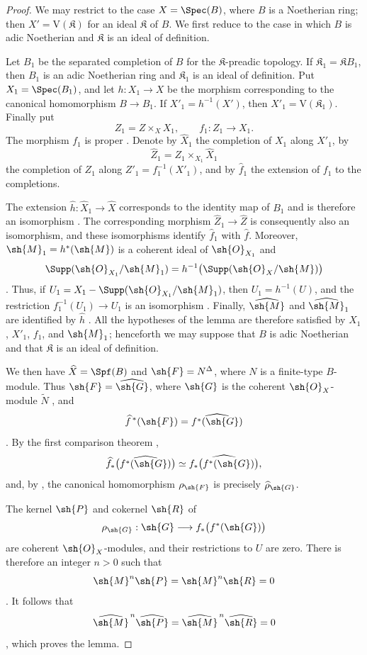 \begin{proof}
We may restrict to the case $X=\Spec(B)$, where $B$ is a
Noetherian ring; then $X'=\mathrm{V}(\mathfrak{K})$ for an ideal
$\mathfrak{K}$ of $B$.  We first reduce to the case in which $B$ is
adic Noetherian and $\mathfrak{K}$ is an ideal of definition.

Let $B_1$ be the separated completion of $B$ for the
$\mathfrak{K}$-preadic topology.
If $\mathfrak{K}_1=\mathfrak{K}B_1$, then $B_1$ is an adic
Noetherian ring and $\mathfrak{K}_1$ is an ideal of definition.
Put $X_1=\Spec(B_1)$, and let $h:X_1\to X$ be the morphism
corresponding to the canonical homomorphism $B\to B_1$.  If
$X'_1=h^{-1}(X')$, then $X'_1=\mathrm{V}(\mathfrak{K}_1)$.  Finally
put
\[
  Z_1=Z\times_X X_1,\qquad f_1:Z_1\longrightarrow X_1.
\]
The morphism $f_1$ is proper .  Denote by
$\widehat{X}_1$ the completion of $X_1$ along $X'_1$, by
\[
  \widehat{Z}_1=
  Z_1\times_{X_1}\widehat{X}_1
\]
the completion of $Z_1$ along
$Z'_1=f_1^{-1}(X'_1)$, and by
$\widehat{f}_1$ the extension of $f_1$ to the completions.

The extension
$\widehat{h}:\widehat{X}_1\to\widehat{X}$ corresponds to the
identity map of $B_1$ and is therefore an isomorphism
.  The corresponding morphism
$\widehat{Z}_1\to\widehat{Z}$ is consequently also an isomorphism,
and these isomorphisms identify $\widehat{f}_1$ with
$\widehat{f}$.  Moreover,
$\sh{M}_1=h^*(\sh{M})$ is a coherent ideal of $\sh{O}_{X_1}$ and
\[
  \Supp(\sh{O}_{X_1}/\sh{M}_1)
  =h^{-1}\bigl(\Supp(\sh{O}_X/\sh{M})\bigr)
\]
.  Thus, if
$U_1=X_1-\Supp(\sh{O}_{X_1}/\sh{M}_1)$, then
$U_1=h^{-1}(U)$, and the restriction
$f_1^{-1}(U_1)\to U_1$ is an isomorphism
.  Finally, $\widehat{\sh{M}}$ and
$\widehat{\sh{M}}_1$ are identified by $\widehat{h}$
.  All the hypotheses of the lemma are therefore
satisfied by $X_1$, $X'_1$, $f_1$, and $\sh{M}_1$; henceforth we
may suppose that $B$ is adic Noetherian and that $\mathfrak{K}$ is
an ideal of definition.

We then have $\widehat{X}=\Spf(B)$ and
$\sh{F}=N^\Delta$, where $N$ is a finite-type $B$-module.  Thus
$\sh{F}=\widehat{\sh{G}}$, where $\sh{G}$ is the coherent
$\sh{O}_X$-module $\widetilde{N}$ , and
\[
  \widehat{f}^{\,*}(\sh{F})
  =\widehat{f^*(\sh{G})}
\]
.  By the first comparison theorem
,
\[
  \widehat{f}_*
  \bigl(\widehat{f^*(\sh{G})}\bigr)
  \simeq
  \widehat{f_*\bigl(f^*(\sh{G})\bigr)},
\]
and, by , the canonical homomorphism
$\rho_{\sh{F}}$ is precisely $\widehat{\rho}_{\sh{G}}$.

The kernel $\sh{P}$ and cokernel $\sh{R}$ of
\[
  \rho_{\sh{G}}:
  \sh{G}\longrightarrow f_*\bigl(f^*(\sh{G})\bigr)
\]
are coherent $\sh{O}_X$-modules, and their restrictions to $U$ are
zero.  There is therefore an integer $n>0$ such that
\[
  \sh{M}^n\sh{P}=\sh{M}^n\sh{R}=0
\]
.  It follows that
\[
  \widehat{\sh{M}}^{\,n}\widehat{\sh{P}}
  =
  \widehat{\sh{M}}^{\,n}\widehat{\sh{R}}
  =0
\]
 , which proves the lemma.
\end{proof}

